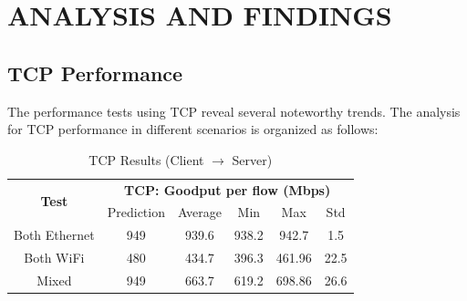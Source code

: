 
\section{ANALYSIS AND FINDINGS} \label{sec:analysis-and-findings}

    \subsection{TCP Performance} \label{subsec:tcp-performance}

        The performance tests using TCP reveal several noteworthy trends. The analysis for TCP performance in different scenarios is organized as follows:

        \begin{table}[H]
            \small
            \centering
            \begin{tabular}{|ll|lllll|}
            \hline
            \multicolumn{2}{|c|}{\multirow{2}{*}{\textbf{Test}}} & 
                \multicolumn{5}{c|}{\textbf{TCP: Goodput per flow (Mbps)}} \\
            \cline{3-7}
            \multicolumn{2}{|c|}{} &
                \multicolumn{1}{c|}{Prediction} &
                \multicolumn{1}{c|}{Average} &
                \multicolumn{1}{c|}{Min} &
                \multicolumn{1}{c|}{Max} &
                \multicolumn{1}{c|}{Std} \\
            \hline
            \multicolumn{2}{|c|}{Both Ethernet} &
                \multicolumn{1}{c|}{949} &
                \multicolumn{1}{c|}{939.6} &
                \multicolumn{1}{c|}{938.2} &
                \multicolumn{1}{c|}{942.7} &
                \multicolumn{1}{c|}{1.5} \\
            \hline
            \multicolumn{2}{|c|}{Both WiFi} &
                \multicolumn{1}{c|}{480} &
                \multicolumn{1}{c|}{434.7} &
                \multicolumn{1}{c|}{396.3} &
                \multicolumn{1}{c|}{461.96} &
                \multicolumn{1}{c|}{22.5} \\
            \hline
            \multicolumn{2}{|c|}{Mixed} &
                \multicolumn{1}{c|}{949} &
                \multicolumn{1}{c|}{663.7} &
                \multicolumn{1}{c|}{619.2} &
                \multicolumn{1}{c|}{698.86} &
                \multicolumn{1}{c|}{26.6} \\
            \hline
            \end{tabular}
            \vspace{0.5cm}
            \caption{TCP Results (Client $\rightarrow$ Server)}
            \label{tab:tcp-results}
        \end{table}

